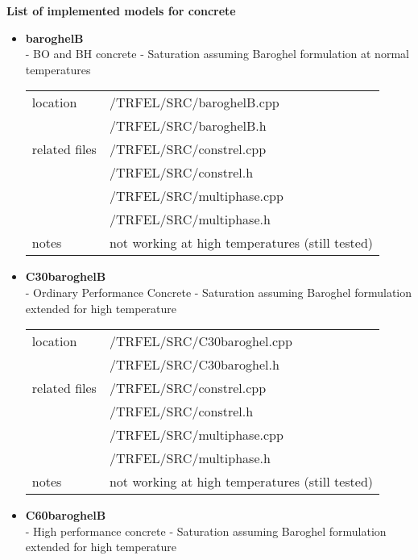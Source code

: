 {\bf List of implemented models for concrete}
\begin{itemize}
\item{\bf baroghelB}\\ 
- BO and BH concrete - Saturation assuming Baroghel formulation at normal temperatures

\begin{center}
\begin{tabular}{|l|l|}
\hline
location & /TRFEL/SRC/baroghelB.cpp\\
         & /TRFEL/SRC/baroghelB.h
\\ \hline
related files & /TRFEL/SRC/constrel.cpp\\
              & /TRFEL/SRC/constrel.h\\
              & /TRFEL/SRC/multiphase.cpp\\
              & /TRFEL/SRC/multiphase.h
\\ \hline
notes & not working at high temperatures (still tested) 
\\ \hline
\end{tabular}
\end{center}

\item{\bf C30baroghelB}\\
 - Ordinary Performance Concrete - Saturation assuming Baroghel formulation extended for high temperature

\begin{center}
\begin{tabular}{|l|l|}
\hline
location & /TRFEL/SRC/C30baroghel.cpp\\
         & /TRFEL/SRC/C30baroghel.h
\\ \hline
related files & /TRFEL/SRC/constrel.cpp\\
              & /TRFEL/SRC/constrel.h\\
              & /TRFEL/SRC/multiphase.cpp\\
              & /TRFEL/SRC/multiphase.h
\\ \hline
notes & not working at high temperatures (still tested) 
\\ \hline
\end{tabular}
\end{center}

\item{\bf C60baroghelB}\\
 - High performance concrete - Saturation assuming Baroghel formulation extended for high temperature


\end{itemize}
